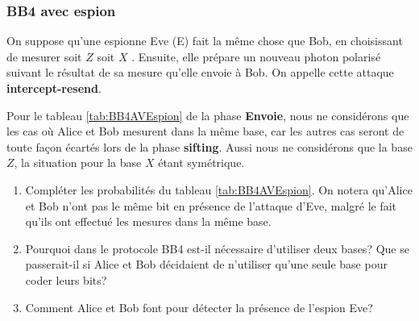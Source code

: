 \subsubsection{BB4 avec espion}

On suppose qu'une espionne Eve (E) fait la même chose que Bob, en choisissant
de mesurer soit $Z$ soit $X$ . Ensuite, elle prépare un nouveau photon
polarisé suivant le résultat de sa mesure qu'elle envoie à Bob. On appelle
cette attaque \textbf{intercept-resend}.

Pour le tableau \ref{tab:BB4AVEspion} de la phase \textbf{Envoie}, nous ne
considérons que les cas où Alice et Bob mesurent dans la même base, car les
autres cas seront de toute façon écartés lors de la phase \textbf{sifting}.
Aussi nous ne considérons que la base $Z$, la situation pour la base $X$ étant
symétrique.

\begin{enumerate}
\item Compléter les probabilités du tableau \ref{tab:BB4AVEspion}. On notera
qu'Alice et Bob n'ont pas le même bit en présence de l'attaque d'Eve, malgré
le fait qu'ils ont effectué les mesures dans la même base.

\item Pourquoi dans le protocole BB4 est-il nécessaire d'utiliser deux bases?
Que se passerait-il si Alice et Bob décidaient de n'utiliser qu'une seule base
pour coder leurs bits?

\item Comment Alice et Bob font pour détecter la présence de l'espion Eve?
\end{enumerate}

